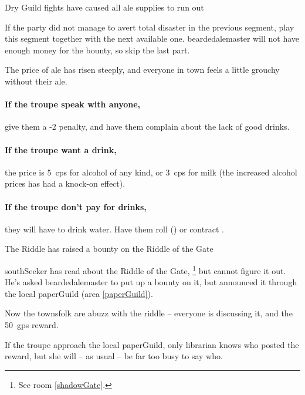 {\squash Dry}%
{Guild fights have caused all ale supplies to run out}%

If the party did not manage to avert total disaster in the previous \gls{segment}, play this \gls{segment} together with the next available one.
\Gls{beardedalemaster} will not have enough money for the bounty, so skip the last part.

The price of ale has risen steeply, and everyone in \gls{town} feels a little grouchy without their ale.

\paragraph{If the troupe speak with anyone,}
give them a -2 penalty, and have them complain about the lack of good drinks.

\paragraph{If the troupe want a drink,}
the price is 5~\glspl{cp} for alcohol of any kind, or 3~\glspl{cp} for milk (the increased alcohol prices has had a knock-on effect).

\paragraph{If the troupe don't pay for drinks,}
they will have to drink water.
Have them roll  (\tn[10]) or contract \iftoggle{judgement}{Spychoke\exRef{judgement}{Judgement}{diseases}}{a nasty disease}.

{The Riddle}%
{ has raised a bounty on the Riddle of the Gate}%

\Gls{southSeeker} has read about the Riddle of the Gate,%
\footnote{See room \vref{shadowGate}.}
but cannot figure it out.
He's asked \gls{beardedalemaster} to put up a bounty on it, but announced it through the local \gls{paperGuild} (area \vref{paperGuild}).

Now the townsfolk are abuzz with the riddle -- everyone is discussing it, and the 50~\glspl{gp} reward.

\null
\hardestRiddleEver

If the troupe approach the local \gls{paperGuild}, only \gls{librarian} knows who posted the reward, but she will -- as usual -- be far too busy to say who.
